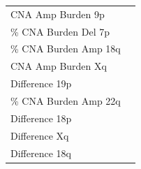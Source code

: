 \begin{table}[!ht]
\begin{minipage}{.49\linewidth}
\begin{tabular}[t]{l>{}r}
CNA Amp Burden 9p & \cellcolor[HTML]{443B84}{\textcolor{white}{16.83}}\\
 
\% CNA Burden Del 7p & \cellcolor[HTML]{481C6E}{\textcolor{white}{45.26}}\\
 
\% CNA Burden Amp 18q & \cellcolor[HTML]{460B5E}{\textcolor{white}{65.25}}\\
 
CNA Amp Burden Xq & \cellcolor[HTML]{46075B}{\textcolor{white}{67.35}}\\
 
Difference 19p & \cellcolor[HTML]{46065A}{\textcolor{white}{70.39}}\\
 
\% CNA Burden Amp 22q & \cellcolor[HTML]{450457}{\textcolor{white}{72.01}}\\
 
Difference 18p & \cellcolor[HTML]{450357}{\textcolor{white}{76.29}}\\
 
Difference Xq & \cellcolor[HTML]{440154}{\textcolor{white}{77.29}}\\
 
Difference 18q & \cellcolor[HTML]{440154}{\textcolor{white}{79.68}}\\
\bottomrule
\end{tabular} \label{table:CNABurdenT2}
    \end{minipage}
\end{table}

